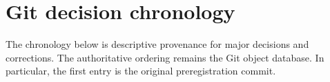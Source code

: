 \chapter{Git decision chronology}\label{s1:ch:app06_git_decision_chronology}

The chronology below is descriptive provenance for major decisions and corrections. The authoritative ordering remains the Git object database. In particular, the first entry is the original preregistration commit.

{\scriptsize
\setlength{\tabcolsep}{3pt}

}
